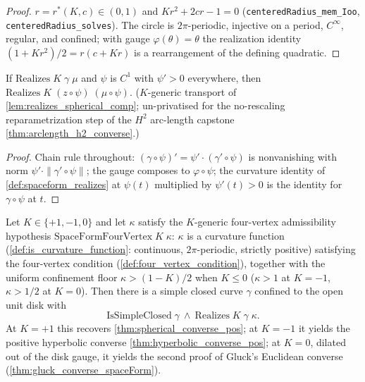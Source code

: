 \begin{proof}
  \leanok
  $r=r^\ast(K,c)\in(0,1)$ and $K r^2+2cr-1=0$
  (\texttt{centeredRadius\_mem\_Ioo}, \texttt{centeredRadius\_solves}). The
  circle is $2\pi$-periodic, injective on a period, $C^\infty$, regular, and
  confined; with gauge $\varphi(\theta)=\theta$ the realization identity
  $(1+K r^2)/2=r(c+K r)$ is a rearrangement of the defining
  quadratic.
\end{proof}

\begin{lemma}
  \label{lem:spaceform_realizes_comp}
  If $\mathrm{Realizes}\;K\;\gamma\;\mu$ and $\psi$ is $C^1$ with
  $\psi'>0$ everywhere, then
  $\mathrm{Realizes}\;K\;(z\circ\psi)\;(\mu\circ\psi)$.
  ($K$-generic transport of \cref{lem:realizes_spherical_comp};
  un-privatised for the no-rescaling reparametrization step of the $H^2$
  arc-length capstone \cref{thm:arclength_h2_converse}.)
\end{lemma}

\begin{proof}
  \leanok
  Chain rule throughout: $(\gamma\circ\psi)'=\psi'\cdot(\gamma'\circ\psi)$ is nonvanishing
  with norm $\psi'\cdot\|\gamma'\circ\psi\|$; the gauge composes to
  $\varphi\circ\psi$; the curvature identity of \cref{def:spaceform_realizes} at
  $\psi(t)$ multiplied by $\psi'(t)>0$ is the identity for $\gamma\circ\psi$ at $t$.
\end{proof}

\begin{theorem}
  \label{thm:spaceform_converse_pos}
  Let $K\in\{+1,-1,0\}$ and let $\kappa$ satisfy the $K$-generic
  four-vertex admissibility hypothesis
  $\mathrm{SpaceFormFourVertex}\;K\;\kappa$: $\kappa$ is a curvature
  function (\cref{def:is_curvature_function}: continuous, $2\pi$-periodic,
  strictly positive) satisfying the four-vertex condition
  (\cref{def:four_vertex_condition}), together with the uniform confinement
  floor $\kappa>(1-K)/2$ when $K\le0$ ($\kappa>1$ at
  $K=-1$, $\kappa>1/2$ at $K=0$). Then there is a simple
  closed curve $\gamma$ confined to the open unit disk with
  \[
    \mathrm{IsSimpleClosed}\;\gamma\ \wedge\ \mathrm{Realizes}\;K\;\gamma\;\kappa.
  \]
  At $K=+1$ this recovers \cref{thm:spherical_converse_pos}; at
  $K=-1$ it yields the positive hyperbolic converse
  \cref{thm:hyperbolic_converse_pos}; at $K=0$, dilated out of the
  disk gauge, it yields the second proof of Gluck's Euclidean converse
  (\cref{thm:gluck_converse_spaceForm}).
\end{theorem}

